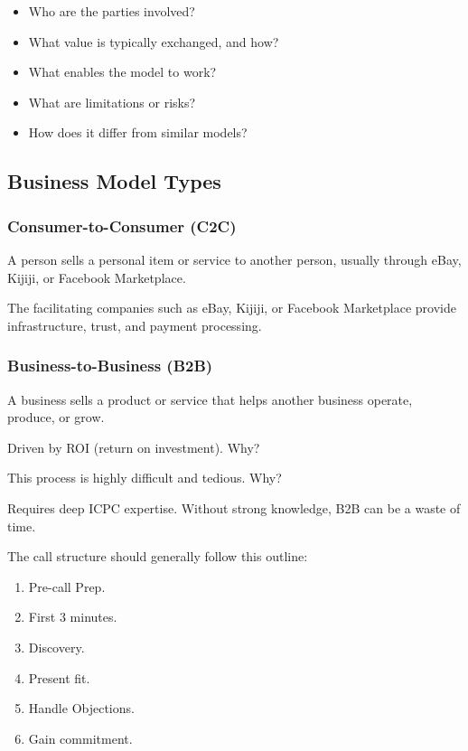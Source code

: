\begin{itemize}
    \item Who are the parties involved?
    \item What value is typically exchanged, and how?
    \item What enables the model to work?
    \item What are limitations or risks?
    \item How does it differ from similar models?
\end{itemize}

\subsection{Business Model Types}

\subsubsection{Consumer-to-Consumer (C2C)}

A person sells a personal item or service to another person, usually through eBay,
Kijiji, or Facebook Marketplace.

\medskip

The facilitating companies such as eBay, Kijiji, or Facebook Marketplace provide
infrastructure, trust, and payment processing.

\subsubsection{Business-to-Business (B2B)}

A business sells a product or service that helps another business operate, produce, or
grow.

\medskip

Driven by ROI (return on investment). Why?

\medskip

This process is highly difficult and tedious. Why?

\medskip

Requires deep ICPC expertise. Without strong knowledge, B2B can be a waste of time.

\medskip

The call structure should generally follow this outline:
\begin{enumerate}
    \item Pre-call Prep.
    \item First 3 minutes.
    \item Discovery.
    \item Present fit.
    \item Handle Objections.
    \item Gain commitment.
\end{enumerate}

